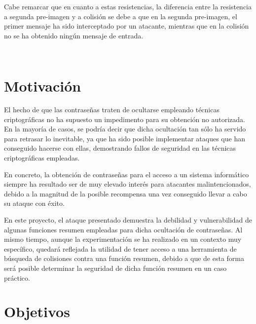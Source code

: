 \documentclass[12pt,spanish,listoffigures,listoftables]{tfgetsinf}
\begin{document}
Cabe remarcar que en cuanto a estas resistencias, la diferencia entre la resistencia a segunda pre-imagen y a colisión se debe a que en la segunda pre-imagen, el primer mensaje ha sido interceptado por un atacante, mientras que en la colisión no se ha obtenido ningún mensaje de entrada.

~\\

\section{Motivaci\'on}

El hecho de que las contraseñas traten de ocultarse empleando técnicas criptográficas no ha supuesto un impedimento para su obtención no autorizada. En la mayoría de casos, se podría decir que dicha ocultación tan sólo ha servido para retrasar lo inevitable, ya que ha sido posible implementar ataques que han conseguido hacerse con ellas, demostrando fallos de seguridad en las técnicas criptográficas empleadas.

En concreto, la obtención de contraseñas para el acceso a un sistema informático siempre ha resultado ser de muy elevado interés para atacantes malintencionados, debido a la magnitud de la posible recompensa una vez conseguido llevar a cabo su ataque con éxito.

En este proyecto, el ataque presentado demuestra la debilidad y vulnerabilidad de algunas funciones resumen empleadas para dicha ocultación de contraseñas. Al mismo tiempo, aunque la experimentación se ha realizado en un contexto muy específico, quedará reflejada la utilidad de tener acceso a una herramienta de búsqueda de colisiones contra una función resumen, debido a que de esta forma será posible determinar la seguridad de dicha función resumen en un caso práctico.
~\\

\section{Objetivos}



    
\end{document}
